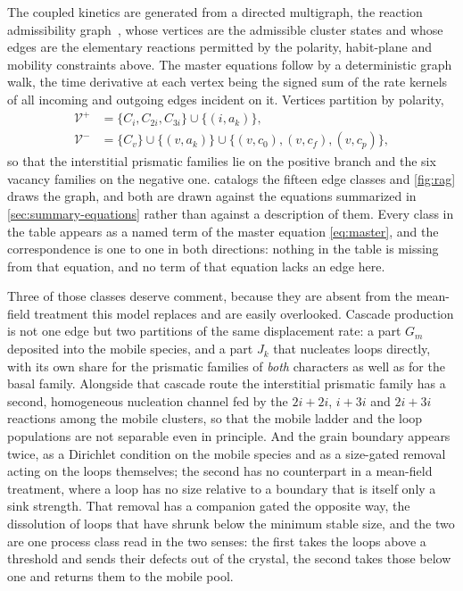 The coupled kinetics are generated from a directed multigraph, the reaction
admissibility graph~\citep{GhoniemRadCluster2026}, whose vertices are the
admissible cluster states and whose edges are the elementary reactions permitted
by the polarity, habit-plane and mobility constraints above. The master
equations follow by a deterministic graph walk, the time derivative at each
vertex being the signed sum of the rate kernels of all incoming and outgoing
edges incident on it. Vertices partition by
polarity,
\begin{align}
  \mathcal V^{+} &= \{C_i,C_{2i},C_{3i}\}\cup\{(i,a_k)\}, \\
  \mathcal V^{-} &= \{C_v\}\cup\{(v,a_k)\}\cup\{(v,c_0),(v,c_f),(v,c_p)\},
\end{align}
so that the interstitial prismatic families lie on the positive branch and the
six vacancy families on the negative one.  catalogs the
fifteen edge classes and \cref{fig:rag} draws the graph, and both are drawn
against the equations summarized in \cref{sec:summary-equations} rather than
against a description of them. Every class in the table appears as a named term
of the master equation \cref{eq:master}, and the correspondence is one to one in
both directions: nothing in the table is missing from that equation, and no term
of that equation lacks an edge here.

Three of those classes deserve comment, because they are absent from the
mean-field treatment this model replaces and are easily overlooked. Cascade
production is not one edge but two partitions of the same displacement rate: a
part $G_m$ deposited into the mobile species, and a part $J_k$ that nucleates
loops directly, with its own share for the prismatic families of \emph{both}
characters as well as for the basal family. Alongside that cascade route the
interstitial prismatic family has a second, homogeneous nucleation channel fed by
the $2i+2i$, $i+3i$ and $2i+3i$ reactions among the mobile clusters, so that the mobile ladder
and the loop populations are not separable even in principle. And the grain
boundary appears twice, as a Dirichlet condition on the mobile species and as a
size-gated removal acting on the loops themselves; the second has no counterpart
in a mean-field treatment, where a loop has no size relative to a boundary that
is itself only a sink strength. That removal has a companion gated the opposite
way, the dissolution of loops that have shrunk below the minimum stable size,
and the two are one process class read in the two senses: the first takes the
loops above a threshold and sends their defects out of the crystal, the second
takes those below one and returns them to the mobile pool.

